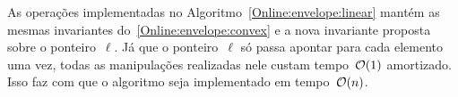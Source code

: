 As operações implementadas no Algoritmo~\ref{Online:envelope:linear} mantém as mesmas invariantes do~\ref{Online:envelope:convex} e a nova invariante proposta sobre o ponteiro~$\ell$. Já que o ponteiro~$\ell$ só passa apontar para cada elemento uma vez, todas as manipulações realizadas nele custam tempo~$\mathcal{O}(1)$ amortizado. Isso faz com que o algoritmo seja implementado em tempo~$\mathcal{O}(n)$.
